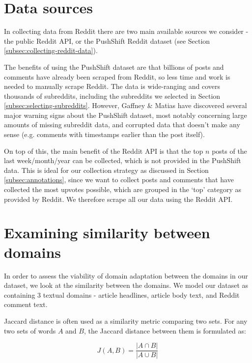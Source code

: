 \section{Data sources}

In collecting data from Reddit there are two main available sources we consider - the public Reddit API, or the PushShift Reddit dataset (see Section \ref{subsec:collecting-reddit-data}).

The benefits of using the PushShift dataset are that billions of posts and comments have already been scraped from Reddit, so less time and work is needed to manually scrape Reddit. The data is wide-ranging and covers thousands of subreddits, including the subreddits we selected in Section \ref{subsec:selecting-subreddits}. However, Gaffney \& Matias \cite{pushshift-problems} have discovered several major warning signs about the PushShift dataset, most notably concerning large amounts of missing subreddit data, and corrupted data that doesn't make any sense (e.g. comments with timestamps earlier than the post itself).

On top of this, the main benefit of the Reddit API is that the top $ n $ posts of the last week/month/year can be collected, which is not provided in the PushShift data. This is ideal for our collection strategy as discussed in Section \ref{subsec:annotations}, since we want to collect posts and comments that have collected the most upvotes possible, which are grouped in the `top' category as provided by Reddit. We therefore scrape all our data using the Reddit API.

\section{Examining similarity between domains} \label{sec:domain-similarity}

In order to assess the viability of domain adaptation between the domains in our dataset, we look at the similarity between the domains. We model our dataset as containing 3 textual domains - article headlines, article body text, and Reddit comment text.

Jaccard distance is often used as a similarity metric comparing two sets. For any two sets of words $ A $ and $ B $, the Jaccard distance between them is formulated as:

\begin{equation}
    J(A, B) = \frac{|A \cap B|}{|A \cup B|}
\end{equation}

